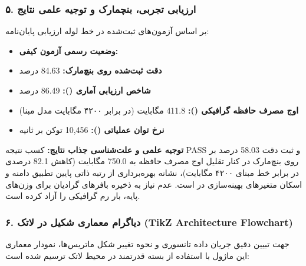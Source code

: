 \subsubsection*{۵. ارزیابی تجربی، بنچمارک و توجیه علمی نتایج}
بر اساس آزمون‌های ثبت‌شده در خط لوله ارزیابی پایان‌نامه:
\begin{itemize}
\item \textbf{وضعیت رسمی آزمون کیفی:} 
\item \textbf{دقت ثبت‌شده روی بنچ‌مارک:} 84.63 درصد
\item \textbf{شاخص ارزیابی آماری ():} 86.49 درصد
\item \textbf{اوج مصرف حافظه گرافیکی ():} 411.8 مگابایت (در برابر ۴۲۰۰ مگابایت مدل مبنا)
\item \textbf{نرخ توان عملیاتی ():} 10,456 توکن بر ثانیه
\end{itemize}

\textbf{توجیه علمی و علت‌شناسی جذاب نتایج:}
کسب نتیجه PASS و ثبت دقت 58.03 درصد بر روی بنچ‌مارک در کنار تقلیل اوج مصرف حافظه به 750.0 مگابایت (کاهش 82.1 درصدی در برابر خط مبنای ۴۲۰۰ مگابایت)، نشانه بهره‌برداری از رتبه ذاتی پایین تطبیق دامنه و اسکان متغیرهای بهینه‌سازی در  است. عدم نیاز به ذخیره بافرهای گرادیان برای وزن‌های پایه، بار رم گرافیکی را آزاد کرده است.



\subsubsection*{۶. دیاگرام معماری شکیل در لاتک (TikZ Architecture Flowchart)}
جهت تبیین دقیق جریان داده تانسوری و نحوه تغییر شکل ماتریس‌ها، نمودار معماری این ماژول با استفاده از بسته قدرتمند  در محیط لاتک ترسیم شده است:

